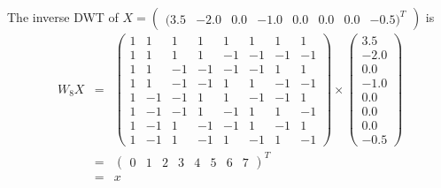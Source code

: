 The inverse DWT of 
$X=\left( \begin{array}{cccccccc}
(3.5 & -2.0 & 0.0 & -1.0 & 0.0 & 0.0 & 0.0 & -0.5)^T
\end{array} \right)$
is
\begin{eqnarray}
W_8 X &=& \left( \begin{array}{cccccccc}
1& 1& 1& 1& 1& 1& 1& 1\\
1& 1& 1& 1&-1&-1&-1&-1\\
1& 1&-1&-1&-1&-1& 1& 1\\
1& 1&-1&-1& 1& 1&-1&-1\\
1&-1&-1& 1& 1&-1&-1& 1\\
1&-1&-1& 1&-1& 1& 1&-1\\
1&-1& 1&-1&-1& 1&-1& 1\\
1&-1& 1&-1& 1&-1& 1&-1
\end{array} \right)
\times \left( \begin{array}{c}
3.5 \\
 -2.0 \\
 0.0 \\
 -1.0 \\
 0.0 \\
 0.0 \\
 0.0 \\
 -0.5
\end{array} \right) \\
 &=& 
\left( \begin{array}{cccccccc}
0 & 1 & 2 & 3 & 4 & 5 & 6 & 7
\end{array} \right)^T\\
 &=& x
\end{eqnarray}

